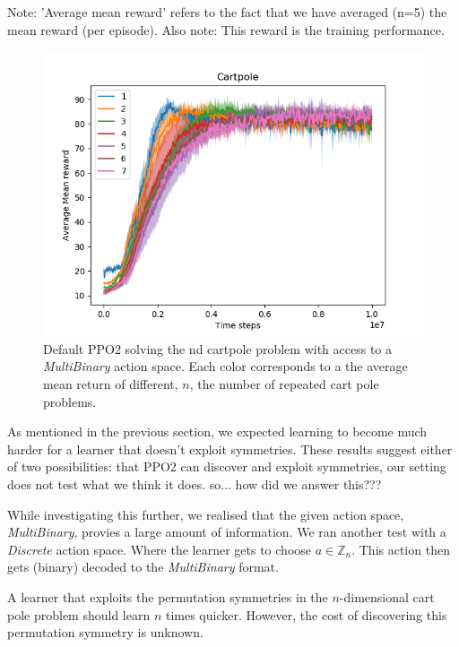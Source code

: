 Note: 'Average mean reward' refers to the fact that we have averaged (n=5)
the mean reward (per episode). Also note: This reward is the training performance.

\begin{figure}[h!]
  \centering
  \includegraphics[width=1\textwidth,height=0.5\textheight]{../../pictures/figures/multibinary-nd-cart.png}
  \caption{Default PPO2 solving the nd cartpole problem with access to a \textit{MultiBinary} action space. Each color corresponds to a the average mean return of different, $n$, the number of repeated cart pole problems.}
\end{figure}

As mentioned in the previous section, we expected learning to become much
harder for a learner that doesn't exploit symmetries. These results suggest either of two possibilities:
that PPO2 can discover and exploit symmetries, our setting does not test what we think it does. {\color{red}so... how did we answer this???}

While investigating this further, we realised that the given action space, \textit{MultiBinary}, provies a large amount of information. We ran another test with a \textit{Discrete} action space. Where the learner gets to choose $a\in \mathbb Z_n$.
This action then gets (binary) decoded to the \textit{MultiBinary} format.

A learner that exploits the permutation symmetries in the $n$-dimensional cart pole problem should learn $n$ times quicker.
However, the cost of discovering this permutation symmetry is unknown.

